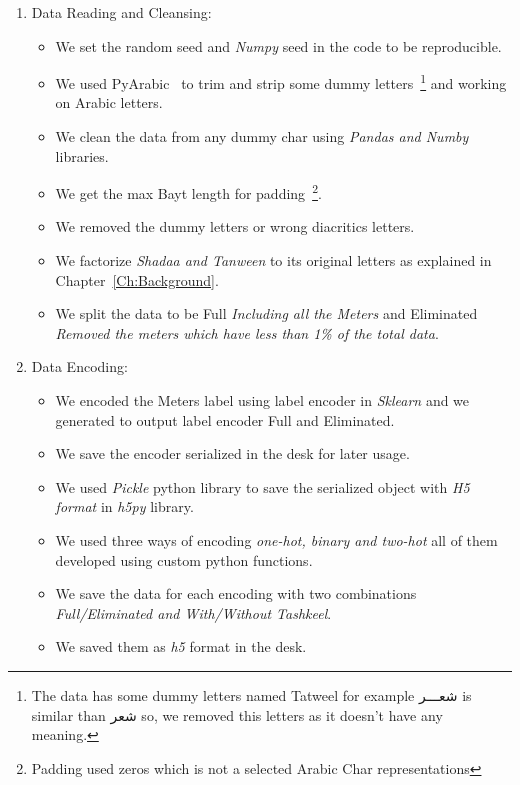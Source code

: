 \begin{enumerate}
  \item Data Reading and Cleansing:
  \begin{itemize}
    \item We set the random seed and \textit{Numpy} seed in the code to be reproducible.
    \item We used PyArabic~\cite{Pyarabic_2010} to trim and strip some dummy letters~\footnote{The data has some dummy letters named Tatweel for example \textarabic{شعـــر} is similar than \textarabic{شعر} so, we removed this letters as it doesn't have any meaning. } and working on Arabic letters.
    \item We clean the data from any dummy char using \textit{Pandas and Numby} libraries.
    \item We get the max Bayt length for padding~\footnote{Padding used zeros which is not a selected Arabic Char representations}.
    \item We removed the dummy letters or wrong diacritics letters.
    \item We factorize \textit{Shadaa and Tanween} to its original letters as explained in Chapter~\ref{Ch:Background}.
    \item We split the data to be Full\textit{ Including all the Meters} and Eliminated\textit{ Removed the meters which have less than 1\% of the total data}.
  \end{itemize}
  
  \item Data Encoding:
  \begin{itemize}
    \item We encoded the Meters label using label encoder in \textit{Sklearn} and we generated to output label encoder Full and Eliminated.
    \item We save the encoder serialized in the desk for later usage.
    \item We used \textit{Pickle} python library to save the serialized object with \textit{H5 format} in \textit{h5py} library.
    \item We used three ways of encoding \textit{\textit{one-hot}, \textit{binary} and \textit{two-hot}} all of them developed using custom python functions.
    \item We save the data for each encoding with two combinations \textit{Full/Eliminated and With/Without Tashkeel}.
    \item We saved them as \textit{h5} format in the desk.
  \end{itemize}


\end{enumerate}
